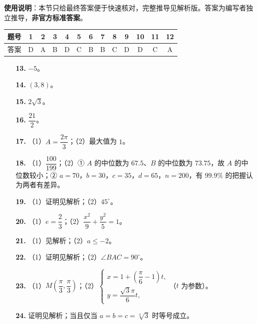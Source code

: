 
\begin{gknotice}
\textbf{使用说明}：本节只给最终答案便于快速核对，完整推导见解析版。答案为编写者独立推导，\textbf{非官方标准答案}。
\end{gknotice}

\begin{center}\begin{tabular}{ccccccccccccc}
\toprule
题号 & 1 & 2 & 3 & 4 & 5 & 6 & 7 & 8 & 9 & 10 & 11 & 12 \\
\midrule
答案 & D & A & B & D & C & B & B & C & D & D & C & A \\
\bottomrule
\end{tabular}\end{center}

\begin{itemize}[leftmargin=2.6em]
  \item[\textbf{13.}] $-5$。
  \item[\textbf{14.}] $(3,8)$。
  \item[\textbf{15.}] $2\sqrt3$。
  \item[\textbf{16.}] $\dfrac{21}{2}$。
\end{itemize}

\begin{itemize}[leftmargin=2.6em]
  \item[\textbf{17.}] （1）$A=\dfrac{2\pi}{3}$；（2）最大值为 $1$。
  \item[\textbf{18.}] （1）$\dfrac{100}{199}$；（2）① $A$ 的中位数为 $67.5$、$B$ 的中位数为 $73.75$，故 $A$ 的中位数较小；② $a=70$，$b=30$，$c=35$，$d=65$，$n=200$，有 $99.9\%$ 的把握认为两者有差异。
  \item[\textbf{19.}] （1）证明见解析；（2）$45^\circ$。
  \item[\textbf{20.}] （1）$e=\dfrac23$；（2）$\dfrac{x^2}{9}+\dfrac{y^2}{5}=1$。
  \item[\textbf{21.}] （1）见解析；（2）$a\leqslant-2$。
\end{itemize}

\begin{itemize}[leftmargin=2.6em]
  \item[\textbf{22.}] （1）证明见解析；（2）$\angle BAC=90^\circ$。
  \item[\textbf{23.}] （1）$M\left(\dfrac{\pi}{3},\dfrac{\pi}{3}\right)$；（2）$\begin{cases}x=1+\left(\dfrac{\pi}{6}-1\right)t,\\y=\dfrac{\sqrt3\pi}{6}t,\end{cases}$（$t$ 为参数）。
  \item[\textbf{24.}] 证明见解析；当且仅当 $a=b=c=\sqrt[4]{3}$ 时等号成立。
\end{itemize}

